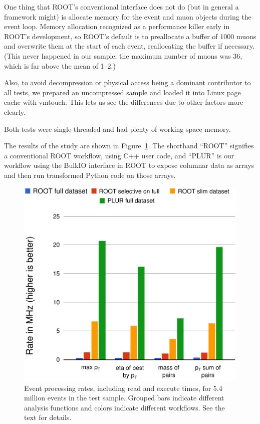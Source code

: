 \documentclass[10pt, conference, compsocconf]{IEEEtran}
\begin{document}
One thing that ROOT's conventional interface does not do (but in general a framework might) is allocate memory for the event and muon objects during the event loop. Memory allocation recognized as a performance killer early in ROOT's development, so ROOT's default is to preallocate a buffer of 1000 muons and overwrite them at the start of each event, reallocating the buffer if necessary. (This never happened in our sample; the maximum number of muons was 36, which is far above the mean of 1--2.)

Also, to avoid decompression or physical access being a dominant contributor to all tests, we prepared an uncompressed sample and loaded it into Linux page cache with vmtouch\cite{vmtouch}. This lets us see the differences due to other factors more clearly.

Both tests were single-threaded and had plenty of working space memory.

The results of the study are shown in Figure~\ref{root-and-plur}. The shorthand ``ROOT'' signifies a conventional ROOT workflow, using C++ user code, and ``PLUR'' is our workflow using the BulkIO interface in ROOT to expose columnar data as arrays and then run transformed Python code on those arrays.

\begin{figure}[!t]
\centering
\includegraphics[width=\linewidth]{root-and-plur.pdf}
\caption{Event processing rates, including read and execute times, for 5.4 million events in the test sample. Grouped bars indicate different analysis functions and colors indicate different workflows. See the text for details.}
\label{root-and-plur}
\end{figure}
\end{document}
